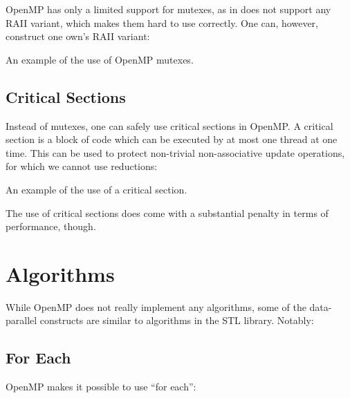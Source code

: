 OpenMP has only a limited support for mutexes, as in does not support any RAII variant, 
which makes them hard to use correctly. One can, however, construct one own's RAII variant:


\raggedbottom
\begin{codebox}[]{\href{https://godbolt.org/z/vnsW7v35z}{\ExternalLink}}
\footnotesize An example of the use of OpenMP mutexes.
\tcblower
{}
\end{codebox}

\subsection{Critical Sections}

Instead of mutexes, one can safely use critical sections in OpenMP. 
A critical section is a block of code which can be executed by at most 
one thread at one time.
This can be used to protect non-trivial non-associative update operations, 
for which we cannot use reductions: 

\raggedbottom
\begin{codebox}[]{\href{https://godbolt.org/z/YYeqYEdv3}{\ExternalLink}}
\footnotesize An example of the use of a critical section.
\tcblower
{}
\end{codebox}

The use of critical sections does come with a substantial penalty in terms of performance, though. 

\section{Algorithms}

While OpenMP does not really implement any algorithms, some of the data-parallel constructs are similar to algorithms in the STL library. Notably:

\subsection{For Each}

OpenMP makes it possible to use ``for each'':

